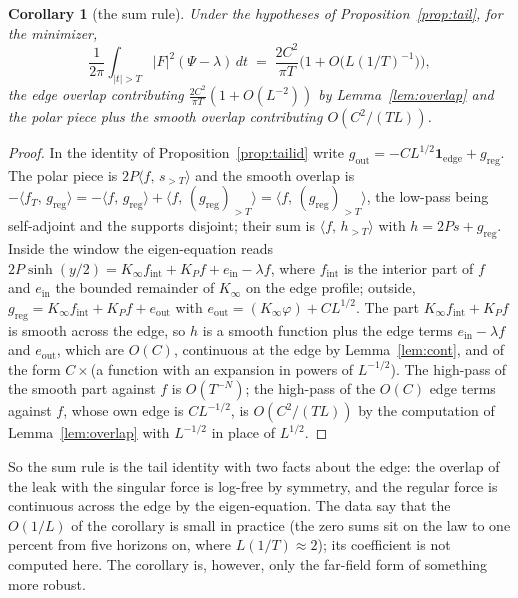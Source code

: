 \documentclass[11pt]{article}
\newtheorem{corollary}[theorem]{Corollary}
\theoremstyle{definition}
\theoremstyle{remark}
\newcommand{\ip}[2]{\langle #1,\, #2\rangle}
\begin{document}
\begin{corollary}[the sum rule]\label{cor:sumrule}
Under the hypotheses of Proposition~\ref{prop:tail}, for the minimizer,
\[
\frac1{2\pi}\int_{|t|>T}|F|^2(\Psi-\lambda)\,dt\;=\;\frac{2C^2}{\pi T}\Big(1+O\big(L(1/T)^{-1}\big)\Big),
\]
the edge overlap contributing $\frac{2C^2}{\pi T}(1+O(L^{-2}))$ by Lemma~\ref{lem:overlap} and the polar piece plus the smooth overlap contributing $O(C^2/(TL))$.
\end{corollary}
\begin{proof}
In the identity of Proposition~\ref{prop:tailid} write $g_{\mathrm{out}}=-CL^{1/2}\mathbf 1_{\mathrm{edge}}+g_{\mathrm{reg}}$. The polar piece is $2P\ip f{s_{>T}}$ and the smooth overlap is $-\ip{f_T}{g_{\mathrm{reg}}}=-\ip f{g_{\mathrm{reg}}}+\ip f{(g_{\mathrm{reg}})_{>T}}=\ip f{(g_{\mathrm{reg}})_{>T}}$, the low-pass being self-adjoint and the supports disjoint; their sum is $\ip f{h_{>T}}$ with $h=2Ps+g_{\mathrm{reg}}$. Inside the window the eigen-equation reads $2P\sinh(y/2)=K_\infty f_{\mathrm{int}}+K_Pf+e_{\mathrm{in}}-\lambda f$, where $f_{\mathrm{int}}$ is the interior part of $f$ and $e_{\mathrm{in}}$ the bounded remainder of $K_\infty$ on the edge profile; outside, $g_{\mathrm{reg}}=K_\infty f_{\mathrm{int}}+K_Pf+e_{\mathrm{out}}$ with $e_{\mathrm{out}}=(K_\infty\varphi)+CL^{1/2}$. The part $K_\infty f_{\mathrm{int}}+K_Pf$ is smooth across the edge, so $h$ is a smooth function plus the edge terms $e_{\mathrm{in}}-\lambda f$ and $e_{\mathrm{out}}$, which are $O(C)$, continuous at the edge by Lemma~\ref{lem:cont}, and of the form $C\times$(a function with an expansion in powers of $L^{-1/2}$). The high-pass of the smooth part against $f$ is $O(T^{-N})$; the high-pass of the $O(C)$ edge terms against $f$, whose own edge is $CL^{-1/2}$, is $O(C^2/(TL))$ by the computation of Lemma~\ref{lem:overlap} with $L^{-1/2}$ in place of $L^{1/2}$.
\end{proof}

So the sum rule is the tail identity with two facts about the edge: the overlap of the leak with the singular force is log-free by symmetry, and the regular force is continuous across the edge by the eigen-equation. The data say that the $O(1/L)$ of the corollary is small in practice (the zero sums sit on the law to one percent from five horizons on, where $L(1/T)\approx2$); its coefficient is not computed here. The corollary is, however, only the far-field form of something more robust.
\end{document}
